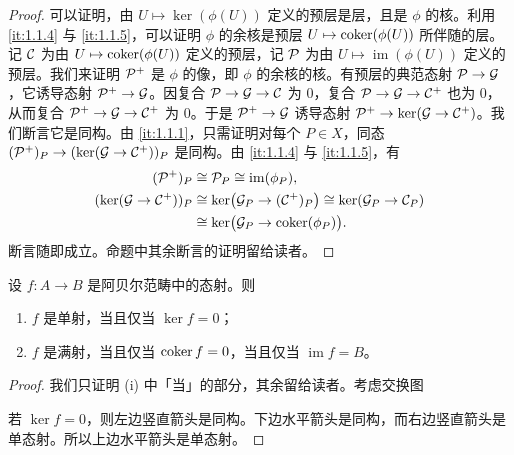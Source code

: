 \begin{proof}
可以证明，由 $U\mapsto\ker(\phi(U))$ 定义的预层是层，且是 $\phi$ 的核。利用 \ref{it:1.1.4} 与 \ref{it:1.1.5}，可以证明 $\phi$ 的余核是预层 $U\mapsto\operatorname{coker}(\phi(U))$ 所伴随的层。记 $\mathcal{C}$ 为由 $U\mapsto\operatorname{coker}(\phi(U))$ 定义的预层，记 $\mathcal{P}$ 为由 $U\mapsto\operatorname{im}(\phi(U))$ 定义的预层。我们来证明 $\mathcal{P}^+$ 是 $\phi$ 的像，即 $\phi$ 的余核的核。有预层的典范态射 $\mathcal{P}\to\mathcal{G}$，它诱导态射 $\mathcal{P}^+\to\mathcal{G}$。因复合 $\mathcal{P}\to\mathcal{G}\to\mathcal{C}$ 为 $0$，复合 $\mathcal{P}\to\mathcal{G}\to\mathcal{C}^+$ 也为 $0$，从而复合 $\mathcal{P}^+\to\mathcal{G}\to\mathcal{C}^+$ 为 $0$。于是 $\mathcal{P}^+\to\mathcal{G}$ 诱导态射 $\mathcal{P}^+\to\ker(\mathcal{G}\to\mathcal{C}^+)$。我们断言它是同构。由 \ref{it:1.1.1}，只需证明对每个 $P\in X$，同态 $(\mathcal{P}^+)_P\to(\ker(\mathcal{G}\to\mathcal{C}^+))_P$ 是同构。由 \ref{it:1.1.4} 与 \ref{it:1.1.5}，有
\begin{align*}
(\mathcal{P}^+)_P&\cong\mathcal{P}_P\cong\operatorname{im}(\phi_P),\\
(\ker(\mathcal{G}\to\mathcal{C}^+))_P&\cong\ker\bigl(\mathcal{G}_P\to(\mathcal{C}^+)_P\bigr)\cong\ker(\mathcal{G}_P\to\mathcal{C}_P)\\
&\cong\ker\bigl(\mathcal{G}_P\to\operatorname{coker}(\phi_P)\bigr).
\end{align*}
断言随即成立。命题中其余断言的证明留给读者。
\end{proof}

\begin{lemma}\label{it:1.1.7}
设 $f\colon A\to B$ 是阿贝尔范畴中的态射。则
\begin{enumerate}[label=(\roman*),leftmargin=2.8em]
  \item $f$ 是单射，当且仅当 $\ker f=0$；
  \item $f$ 是满射，当且仅当 $\operatorname{coker} f=0$，当且仅当 $\operatorname{im}f=B$。
\end{enumerate}
\end{lemma}

\begin{proof}
我们只证明 (i) 中「当」的部分，其余留给读者。考虑交换图
\begin{center}
\end{center}
若 $\ker f=0$，则左边竖直箭头是同构。下边水平箭头是同构，而右边竖直箭头是单态射。所以上边水平箭头是单态射。
\end{proof}

